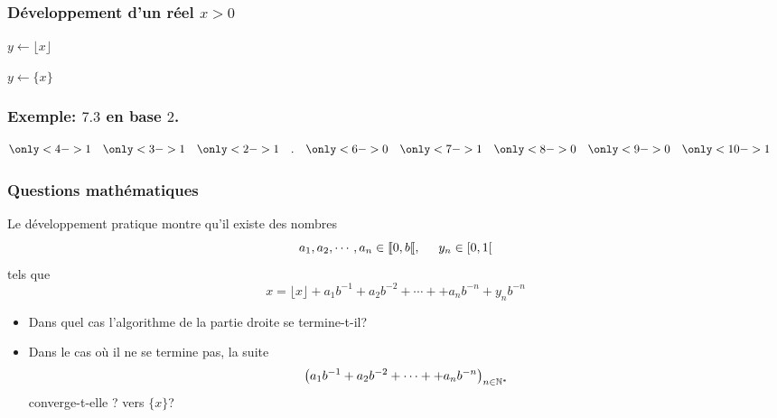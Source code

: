 \begin{frame}
\frametitle{Développement d'un réel $x>0$}
\begin{algorithm}[H]
  $y\longleftarrow \lfloor x \rfloor$\;
  \caption{\`A gauche: les petits d'abord.}
  \label{nbbin_1}
\end{algorithm}
\bigskip
\begin{algorithm}[H]
  $y\longleftarrow \{ x \}$\;
  \caption{\`A droite: les grands d'abord.}
  \label{nbbin_2}
\end{algorithm}
\end{frame}

\begin{frame}
  \frametitle{Exemple: $7.3$ en base $2$.}
  \begin{align*}
  \only<4->1 & & \only<3->1 & &\only<2->{1} & &. & & 
  \only<6->0 & & \only<7->1 & &\only<8->0 & & \only<9->0 & &
  \only<10->1 & &
  \end{align*}
   
   
\end{frame}

\begin{frame}
\frametitle{Questions mathématiques}
Le développement pratique montre qu'il existe des nombres 
\begin{displaymath}
a_1, a_2, \cdots, a_n \in \llbracket 0, b\llbracket, \hspace{0.5cm} y_n \in [0,1[  
\end{displaymath}
tels que 
\begin{displaymath}
  x = \lfloor x \rfloor + a_1b^{-1} + a_2b^{-2} + \cdots + + a_nb^{-n} + y_nb^{-n}  
\end{displaymath}

\begin{itemize}
  \item Dans quel cas l'algorithme de la partie droite se termine-t-il?
  \item Dans le cas où il ne se termine pas, la suite 
\begin{displaymath}
  \left( a_1b^{-1} + a_2b^{-2} + \cdots + + a_nb^{-n}\right)_{n\in \mathbb{N}^*}
\end{displaymath}
converge-t-elle ? vers $\{x\}$?
\end{itemize}  
\end{frame}

